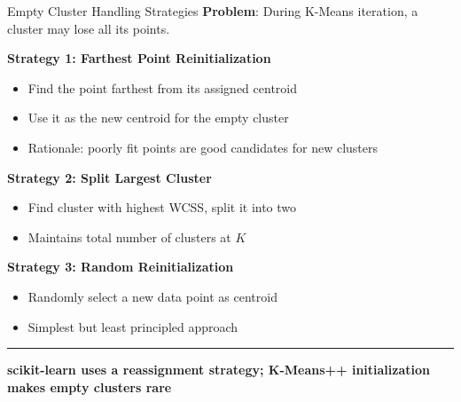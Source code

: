 \documentclass[8pt,aspectratio=169]{beamer}
\newcommand{\bottomnote}[1]{%
\vfill
\vspace{-2mm}
\textcolor{mllavender2}{\rule{\textwidth}{0.4pt}}
\vspace{1mm}
\footnotesize
\textbf{#1}
}
\begin{document}
\begin{frame}[t]{Empty Cluster Handling Strategies}
\textbf{Problem}: During K-Means iteration, a cluster may lose all its points.

\textbf{Strategy 1: Farthest Point Reinitialization}
\begin{itemize}
\item Find the point farthest from its assigned centroid
\item Use it as the new centroid for the empty cluster
\item Rationale: poorly fit points are good candidates for new clusters
\end{itemize}
\vspace{0.3em}
\textbf{Strategy 2: Split Largest Cluster}
\begin{itemize}
\item Find cluster with highest WCSS, split it into two
\item Maintains total number of clusters at $K$
\end{itemize}
\vspace{0.3em}
\textbf{Strategy 3: Random Reinitialization}
\begin{itemize}
\item Randomly select a new data point as centroid
\item Simplest but least principled approach
\end{itemize}
\bottomnote{scikit-learn uses a reassignment strategy; K-Means++ initialization makes empty clusters rare}
\end{frame}
\end{document}
